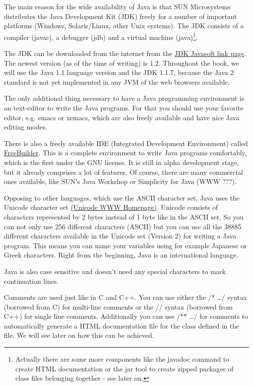 The main reason for the wide availability of Java
is that SUN Microsystems distributes the Java Development Kit (JDK)
freely for a number of important platforms (Windows, Solaris/Linux,
other Unix systems). The JDK consists of a compiler (javac), a
debugger (jdb) and a virtual machine (java)\footnote{Actually there
are some more components like the javadoc command to create HTML
documentation or the jar tool to create zipped packages of
class files belonging together - see later on.}.

The JDK can be downloaded from the internet from the 
\href{http://www.javasoft.com}{JDK Javasoft link page}.
The newest version (as of the time of writing) is 1.2. 
Throughout the book,
we will use the Java 1.1 language version and the JDK 1.1.7,
because the Java 2 standard is not yet implemented in any JVM of the
web browsers available.

The only additional thing necessary to have a Java programming
environment is an text-editor to write the Java programs. For that
you should use your favorite editor, e.g. emacs or xemacs, which are
also freely available and have nice Java editing modes.

There is also a freely available IDE (Integrated Development 
Environment) called \href{http://www.freebuilder.org/}{FreeBuilder}.
This is a complete environment to write Java programs comfortably,
which is the first under the GNU license. It is still in alpha
development stage, but it already comprises a lot of features. Of
course, there are many commercial ones available, like SUN's Java Workshop
or Simplicity for Java (WWW ???).


Opposing to other languages, which use the ASCII character set, Java
uses the Unicode character set \href{http://unicode.org}{(Unicode WWW
Homepage)}. 
Unicode consists of characters represented
by 2 bytes instead of 1 byte like in the ASCII set. So you can not only
use 256 different characters (ASCII) but you can use all the 38885 different
characters available in the Unicode set (Version 2) for writing a Java program.
This means you can name your variables using for example Japanese or Greek
characters. Right from the beginning, Java is an international language.

Java is also case sensitive and doesn't need any special characters
to mark continuation lines. 

Comments are used just like in C and C++.
You can use either the /* \ldots */ syntax (borrowed from C) for
multi-line comments or the // syntax (borrowed from C++) for single
line comments. Additionally you can use /** \ldots */ for comments
to automatically generate a HTML documentation file for the class
defined in the file. We will see later on how this can be achieved.
 
